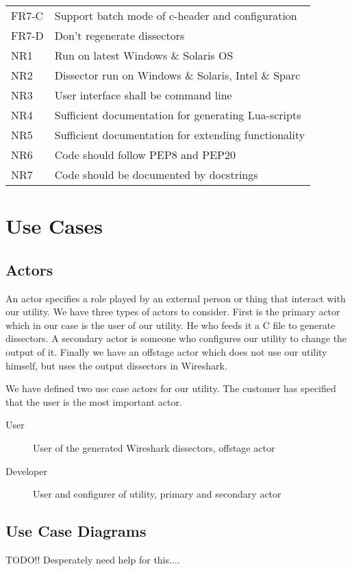 \begin{table}[H]
\begin{tabular}{l l}
	FR7-C & Support batch mode of c-header and configuration \\
	FR7-D & Don't regenerate dissectors \\
	\addlinespace
	NR1 & Run on latest Windows \& Solaris OS \\
	NR2 & Dissector run on Windows \& Solaris, Intel \& Sparc \\
	NR3 & User interface shall be command line \\
	NR4 & Sufficient documentation for generating Lua-scripts \\
	NR5 & Sufficient documentation for extending functionality \\
	NR6 & Code should follow PEP8 and PEP20 \\
	NR7 & Code should be documented by docstrings \\
	\bottomrule
\end{tabular}
\end{table}

\section{Use Cases}
\label{sec:usecases}

\subsection{Actors}
An actor specifies a role played by an external person or thing that interact
with our utility. We have three types of actors to consider. First is the
primary actor which in our case is the user of our utility. He who feeds it a
C file to generate dissectors. A secondary actor is someone who configures our
utility to change the output of it. Finally we have an offstage actor which
does not use our utility himself, but uses the output dissectors in Wireshark.

We have defined two use case actors for our utility. The customer has
specified that the user is the most important actor.
\begin{description}
	\item[User] User of the generated Wireshark dissectors, offstage actor
	\item[Developer] User and configurer of utility, primary and secondary
		actor
\end{description}

\subsection{Use Case Diagrams}
TODO!! Desperately need help for this....

